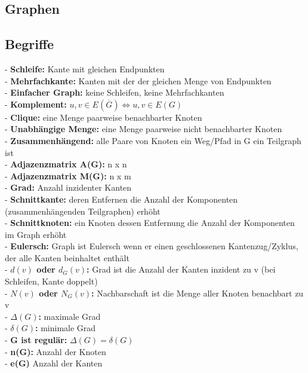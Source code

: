 \documentclass{article}
\begin{document}
\begin{multicols*}{3}
\section{Graphen}
    \subsection{Begriffe}
        - \textbf{Schleife:} Kante mit gleichen Endpunkten
        \\- \textbf{Mehrfachkante:} Kanten mit der der gleichen Menge von Endpunkten
        \\- \textbf{Einfacher Graph:} keine Schleifen, keine Mehrfachkanten
        \\- \textbf{Komplement:} $u, v \in E(\overline {G}) \Leftrightarrow u, v \in E(G)$ 
        \\- \textbf{Clique:} eine Menge paarweise benachbarter Knoten 
        \\- \textbf{Unabhängige Menge:} eine Menge paarweise nicht benachbarter Knoten
        \\- \textbf{Zusammenhängend:} alle Paare von Knoten ein Weg/Pfad in G ein Teilgraph ist
        \\- \textbf{Adjazenzmatrix A(G):} n x n
        \\- \textbf{Adjazenzmatrix M(G):} n x m 
        \\- \textbf{Grad:} Anzahl inzidenter Kanten
        \\- \textbf{Schnittkante:} deren Entfernen die Anzahl der Komponenten (zusammenhängenden Teilgraphen) erhöht
        \\- \textbf{Schnittknoten:} ein Knoten dessen Entfernung die Anzahl der Komponenten im Graph erhöht
        \\- \textbf{Eulersch:} Graph ist Eulersch wenn er einen geschlossenen Kantenzug/Zyklus, der alle Kanten beinhaltet enthält
        \\- \textbf{$d(v)$ oder $d_G(v)$:} Grad ist die Anzahl der Kanten inzident zu v (bei Schleifen, Kante doppelt)
        \\- \textbf{$N(v)$ oder $N_G(v)$:} Nachbarschaft ist die Menge aller Knoten benachbart zu v
        \\- \textbf{$\Delta(G)$:} maximale Grad
        \\- \textbf{$\delta(G)$:} minimale Grad
        \\- \textbf{G ist regulär:} $\Delta(G) = \delta(G)$
        \\- \textbf{n(G):} Anzahl der Knoten
        \\- \textbf{e(G)} Anzahl der Kanten

\end{multicols*}
\end{document}
